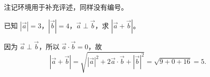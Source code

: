 \begin{remark}
注记环境用于补充评述，同样没有编号。
\end{remark}

\begin{exercise}
已知 $|\vec{a}|=3$，$|\vec{b}|=4$，$\vec{a} \perp \vec{b}$，求 $|\vec{a}+\vec{b}|$。
\end{exercise}
\begin{solution}
因为 $\vec{a} \perp \vec{b}$，所以 $\vec{a}\cdot\vec{b}=0$，故
\[
|\vec{a}+\vec{b}|=\sqrt{|\vec{a}|^2+2\vec{a}\cdot\vec{b}+|\vec{b}|^2}=\sqrt{9+0+16}=5.
\]
\end{solution}

